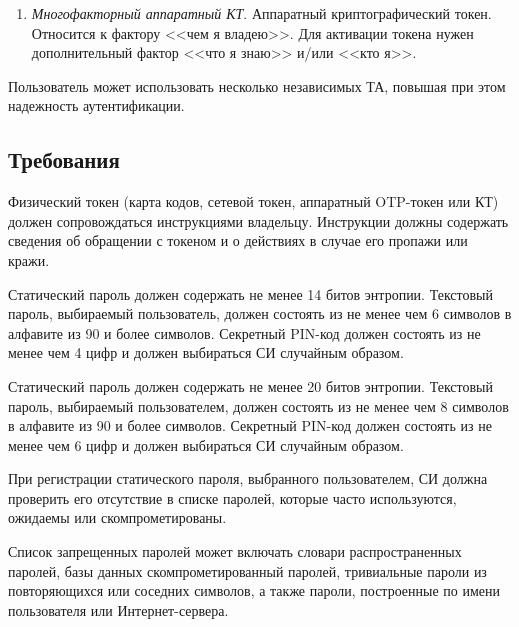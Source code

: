 \begin{enumerate}
\item
{\it Многофакторный аппаратный КТ}.
Аппаратный криптографический токен.
Относится к фактору <<чем я владею>>. 
Для активации токена нужен дополнительный фактор <<что я знаю>> 
и/или <<кто я>>.  
\end{enumerate}


Пользователь может использовать несколько независимых ТА, повышая при этом 
надежность аутентификации. 

\subsection{Требования}\label{TI.Reqs}


Физический токен (карта кодов, сетевой токен, аппаратный OTP-токен или КТ)
должен сопровождаться инструкциями владельцу. Инструкции должны содержать 
сведения об обращении с токеном и о действиях в случае его пропажи или 
кражи. 


Статический пароль должен содержать не менее 14 битов энтропии.
Текстовый пароль, выбираемый пользователь,
должен состоять из не менее чем 6 символов в алфавите
из 90 и более символов. Секретный PIN-код должен состоять из не менее
чем 4 цифр и должен выбираться СИ случайным образом. 
%


\label{R.TI.SP2}
Статический пароль должен содержать не менее 20 битов энтропии.
Текстовый пароль, выбираемый пользователем,
должен состоять из не менее чем 8 символов в алфавите
из 90 и более символов. Секретный PIN-код должен состоять из не менее
чем 6 цифр и должен выбираться СИ случайным образом. 

При регистрации статического пароля, выбранного пользователем, СИ должна 
проверить его отсутствие в списке паролей, которые часто используются,
ожидаемы или скомпрометированы.


\begin{note*}
Список запрещенных паролей может включать словари распространенных паролей,
базы данных скомпрометированный паролей, тривиальные пароли из повторяющихся
или соседних символов, а также пароли, построенные по имени пользователя или 
Интернет-сервера.
\end{note*}


